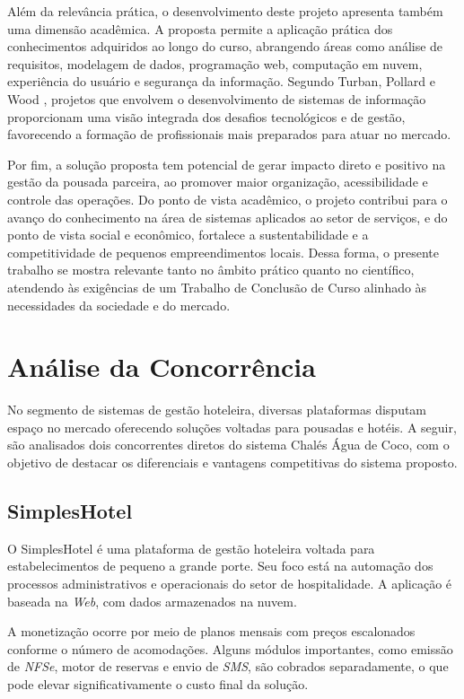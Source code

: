 \documentclass[
	12pt,				%
	openany,			%
	oneside,			%
	a4paper,			%
	english,			%
	french,				%
	spanish,			%
	brazil				%
	]{abntex2}
\begin{document}
Além da relevância prática, o desenvolvimento deste projeto apresenta também uma dimensão acadêmica. A proposta permite a aplicação prática dos conhecimentos adquiridos ao longo do curso, abrangendo áreas como análise de requisitos, modelagem de dados, programação web, computação em nuvem, experiência do usuário e segurança da informação. Segundo Turban, Pollard e Wood \cite{turban2018sistemas}, projetos que envolvem o desenvolvimento de sistemas de informação proporcionam uma visão integrada dos desafios tecnológicos e de gestão, favorecendo a formação de profissionais mais preparados para atuar no mercado.

Por fim, a solução proposta tem potencial de gerar impacto direto e positivo na gestão da pousada parceira, ao promover maior organização, acessibilidade e controle das operações. Do ponto de vista acadêmico, o projeto contribui para o avanço do conhecimento na área de sistemas aplicados ao setor de serviços, e do ponto de vista social e econômico, fortalece a sustentabilidade e a competitividade de pequenos empreendimentos locais. Dessa forma, o presente trabalho se mostra relevante tanto no âmbito prático quanto no científico, atendendo às exigências de um Trabalho de Conclusão de Curso alinhado às necessidades da sociedade e do mercado.


\section{Análise da Concorrência}
No segmento de sistemas de gestão hoteleira, diversas plataformas disputam espaço no mercado oferecendo soluções voltadas para pousadas e hotéis. A seguir, são analisados dois concorrentes diretos do sistema Chalés Água de Coco, com o objetivo de destacar os diferenciais e vantagens competitivas do sistema proposto.

\subsection{SimplesHotel}
O SimplesHotel é uma plataforma de gestão hoteleira voltada para estabelecimentos de pequeno a grande porte. Seu foco está na automação dos processos administrativos e operacionais do setor de hospitalidade. A aplicação é baseada na \textit{Web}, com dados armazenados na nuvem.

A monetização ocorre por meio de planos mensais com preços escalonados conforme o número de acomodações. Alguns módulos importantes, como emissão de \textit{NFSe}, motor de reservas e envio de \textit{SMS}, são cobrados separadamente, o que pode elevar significativamente o custo final da solução.
\end{document}
